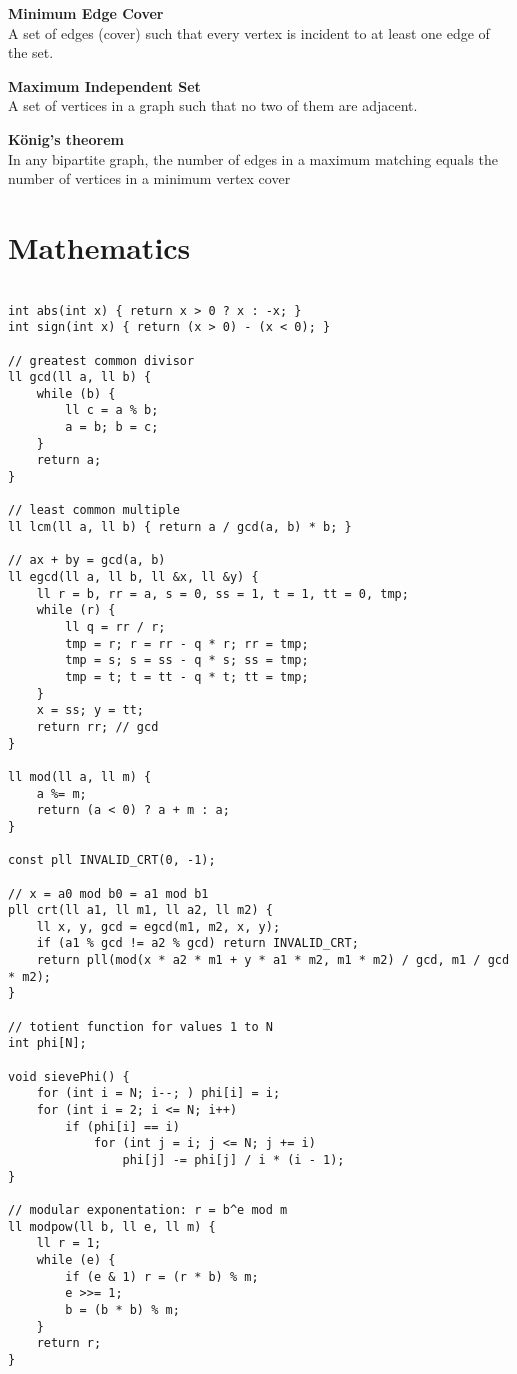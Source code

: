 \documentclass{article}
\begin{document}
\textbf{Minimum Edge Cover} \\
A set of edges (cover) such that every vertex is incident to at least one edge of the set.

\textbf{Maximum Independent Set} \\
A set of vertices in a graph such that no two of them are adjacent.

\textbf{K\"{o}nig's theorem} \\
In any bipartite graph, the number of edges in a maximum matching equals the number of vertices in a minimum vertex cover

\section{Mathematics}

\begin{lstlisting}

int abs(int x) { return x > 0 ? x : -x; }
int sign(int x) { return (x > 0) - (x < 0); }

// greatest common divisor
ll gcd(ll a, ll b) {
	while (b) {
		ll c = a % b;
		a = b; b = c;
	}
	return a;
}

// least common multiple
ll lcm(ll a, ll b) { return a / gcd(a, b) * b; }

// ax + by = gcd(a, b)
ll egcd(ll a, ll b, ll &x, ll &y) {
	ll r = b, rr = a, s = 0, ss = 1, t = 1, tt = 0, tmp;
	while (r) {
		ll q = rr / r;
		tmp = r; r = rr - q * r; rr = tmp;
		tmp = s; s = ss - q * s; ss = tmp;
		tmp = t; t = tt - q * t; tt = tmp;
	}
	x = ss; y = tt;
	return rr; // gcd
}

ll mod(ll a, ll m) {
	a %= m;
	return (a < 0) ? a + m : a;
}

const pll INVALID_CRT(0, -1);

// x = a0 mod b0 = a1 mod b1
pll crt(ll a1, ll m1, ll a2, ll m2) {
	ll x, y, gcd = egcd(m1, m2, x, y);
	if (a1 % gcd != a2 % gcd) return INVALID_CRT;
	return pll(mod(x * a2 * m1 + y * a1 * m2, m1 * m2) / gcd, m1 / gcd * m2);
}

// totient function for values 1 to N
int phi[N];

void sievePhi() {
	for (int i = N; i--; ) phi[i] = i;
	for (int i = 2; i <= N; i++)
		if (phi[i] == i)
			for (int j = i; j <= N; j += i)
				phi[j] -= phi[j] / i * (i - 1);
}

// modular exponentation: r = b^e mod m
ll modpow(ll b, ll e, ll m) {
	ll r = 1;
	while (e) {
		if (e & 1) r = (r * b) % m;
		e >>= 1;
		b = (b * b) % m;
	}
	return r;
}
\end{lstlisting}
\end{document}
